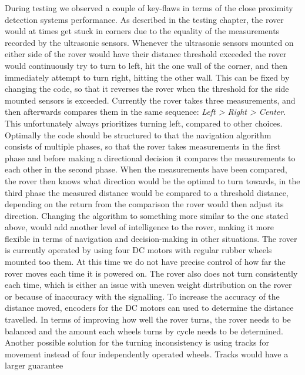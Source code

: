 During testing we observed a couple of key-flaws in terms of the close proximity detection systems performance.
As described in the testing chapter, the rover would at times get stuck in corners due to the equality of the measurements recorded by the ultrasonic sensors. Whenever the ultrasonic sensors mounted on either side of the rover would have their distance threshold exceeded the rover would continuously try to turn to left, hit the one wall of the corner, and then immediately attempt to turn right, hitting the other wall. This can be fixed by changing the code, so that it reverses the rover when the threshold for the side mounted sensors is exceeded. Currently the rover takes three measurements, and then afterwards compares them in the same sequence: \textit{Left > Right > Center}. This unfortunately always prioritizes turning left, compared to other choices. Optimally the code should be structured to that the navigation algorithm consists of multiple phases, so that the rover takes measurements in the first phase and before making a directional decision it compares the measurements to each other in the second phase. When the measurements have been compared, the rover then knows what direction would be the optimal to turn towards, in the third phase the measured distance would be compared to a threshold distance, depending on the return from the comparison the rover would then adjust its direction.
Changing the algorithm to something more similar to the one stated above, would add another level of intelligence to the rover, making it more flexible in terms of navigation and decision-making in other situations.
The rover is currently operated by using four DC motors with regular rubber wheels mounted too them. At this time we do not have precise control of how far the rover moves each time it is powered on.
 The rover also does not turn consistently each time, which is either an issue with uneven weight distribution on the rover or because of inaccuracy with the signalling.
To increase the accuracy of the distance moved, encoders for the DC motors can used to determine the distance travelled.
 In terms of improving how well the rover turns, the rover needs to be balanced and the amount each wheels turns by cycle needs to be determined. Another possible solution for the turning inconsistency is using tracks for movement instead of four independently operated wheels. Tracks would have a larger guarantee %

